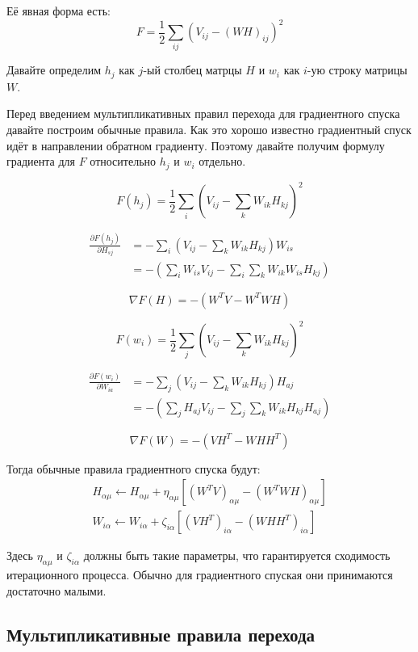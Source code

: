 \documentclass[oneside, final, 12pt]{extarticle}
\begin{document}
Её явная форма есть:
\[
  F = \frac{1}{2} \sum_{ij}
  \left(
    V_{ij} - (WH)_{ij}
  \right)^2
\]

Давайте определим $h_j$ как $j$-ый столбец матрцы $H$
и $w_i$ как $i$-ую строку матрицы $W$.

Перед введением мультипликативных правил перехода
для градиентного спуска давайте построим обычные правила.
Как это хорошо известно градиентный спуск идёт в направлении
обратном градиенту. Поэтому давайте получим формулу градиента
для $F$ относительно $h_j$ и $w_i$ отдельно.

\[
  F(h_j) = \frac{1}{2} \sum_{i}
  \left(
    V_{ij} - \sum_{k}W_{ik}H_{kj}
  \right)^2
\]

\begin{align*}
  \frac{\partial F(h_j)}{\partial H_{sj}}
  &=
  - \sum_i
    \left(
      V_{ij} - \sum_k W_{ik}H_{kj}
    \right)
  W_{is} \\
  &=
  -
    \left(
      \sum_i W_{is}V_{ij} - \sum_i\sum_kW_{ik}W_{is}H_{kj}
    \right)
\end{align*}

\[
  \nabla F(H) = - ( W^TV - W^TWH )
\]

\[
  F(w_i) = \frac{1}{2}\sum_j
    \left( V_{ij} - \sum_k W_{ik}H_{kj} \right)^2
\]

\begin{align*}
  \frac{\partial F(w_i)}{\partial W_{ia}}
  &=
  - \sum_j
    \left(
      V_{ij} - \sum_k W_{ik}H_{kj}
    \right)
  H_{aj} \\
  &=
  -
    \left(
      \sum_j H_{aj}V_{ij} - \sum_j \sum_k W_{ik}H_{kj}H_{aj}
    \right)
\end{align*}

\[
  \nabla F(W) = - ( VH^T - WHH^T )
\]

Тогда обычные правила градиентного спуска будут:
\begin{align*}
  H_{\alpha\mu} \leftarrow H_{\alpha\mu} +
  \eta_{\alpha\mu} \left[
     (W^TV)_{\alpha\mu} - (W^TWH)_{\alpha\mu}
  \right] \\
  W_{i\alpha} \leftarrow W_{i\alpha} +
  \zeta_{i\alpha} \left[
    (VH^T)_{i\alpha} - (WHH^T)_{i\alpha}
  \right]
\end{align*}

Здесь $\eta_{\alpha\mu}$ и $\zeta_{i\alpha}$ должны быть
такие параметры, что гарантируется сходимость итерационного
процесса.
Обычно для градиентного спуская они принимаются достаточно малыми.

\subsection{Мультипликативные правила перехода}
\end{document}
